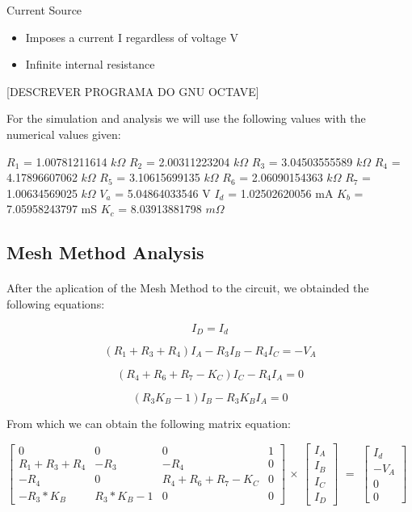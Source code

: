 Current Source

\begin{itemize}
	\item Imposes a current I regardless of voltage V
	\item Infinite internal resistance
\end{itemize}

[DESCREVER PROGRAMA DO GNU OCTAVE]

For the simulation and analysis we will use the following values with the numerical values given:

$R_1$ = 1.00781211614 $k\Omega$
$R_2$ = 2.00311223204 $k\Omega$
$R_3$ = 3.04503555589 $k\Omega$
$R_4$ = 4.17896607062 $k\Omega$
$R_5$ = 3.10615699135 $k\Omega$
$R_6$ = 2.06090154363 $k\Omega$
$R_7$ = 1.00634569025 $k\Omega$
$V_a$ = 5.04864033546 V
$I_d$ = 1.02502620056 mA
$K_b$ = 7.05958243797 mS
$K_c$ = 8.03913881798 $m\Omega$

\subsection{Mesh Method Analysis}

\paragraph{} After the aplication of the Mesh Method to the circuit, we obtainded the following equations:

\begin{equation}
	I_D = I_d
	\label{eq:1}
\end{equation}

\begin{equation}
	(R_1 + R_3 + R_4) I_A -R_3 I_B - R_4 I_C = - V_A
	\label{eq:1}
\end{equation}

\begin{equation}
	(R_4 + R_6 + R_7 - K_C) I_C - R_4 I_A = 0
	\label{eq:2}
\end{equation}

\begin{equation}
	(R_3 K_B - 1) I_B - R_3 K_B I_A = 0
	\label{eq:3}
\end{equation}

From which we can obtain the following matrix equation:


$
\begin{bmatrix}
	0 & 0 & 0 & 1 \\
	R_1 + R_3 + R_4 &  -R_3 & - R_4 & 0 \\
	-R_4 & 0 & R_4 + R_6 + R_7 - K_C & 0 \\
	-R_3 * K_B & R_3 * K_B - 1 & 0 & 0
\end{bmatrix}
$
$\times$
$
\begin{bmatrix}
	I_A \\
	I_B \\
	I_C \\
	I_D
\end{bmatrix}
$
$=$
$
\begin{bmatrix}
	I_d \\
	-V_A \\
	0 \\
	0
\end{bmatrix}
$


